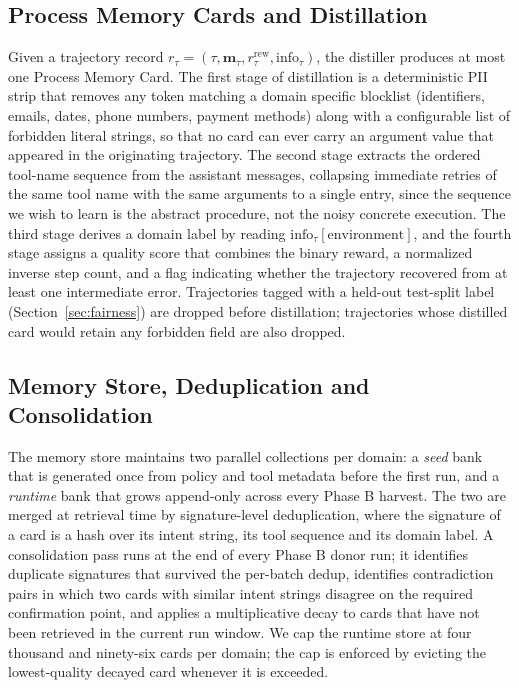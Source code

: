 \documentclass[conference]{IEEEtran}
\begin{document}
\subsection{Process Memory Cards and Distillation}

Given a trajectory record $r_\tau = (\tau, \mathbf{m}_\tau,
r_\tau^{\text{rew}}, \text{info}_\tau)$, the distiller produces at
most one Process Memory Card. The first stage of distillation is a
deterministic PII strip that removes any token matching a domain
specific blocklist (identifiers, emails, dates, phone numbers,
payment methods) along with a configurable list of forbidden
literal strings, so that no card can ever carry an argument value
that appeared in the originating trajectory. The second stage
extracts the ordered tool-name sequence from the assistant
messages, collapsing immediate retries of the same tool name with
the same arguments to a single entry, since the sequence we wish
to learn is the abstract procedure, not the noisy concrete
execution. The third stage derives a domain label by reading
$\text{info}_\tau[\text{environment}]$, and the fourth stage
assigns a quality score that combines the binary reward, a
normalized inverse step count, and a flag indicating whether the
trajectory recovered from at least one intermediate error.
Trajectories tagged with a held-out test-split label
(Section~\ref{sec:fairness}) are dropped before distillation;
trajectories whose distilled card would retain any forbidden field
are also dropped.

\subsection{Memory Store, Deduplication and Consolidation}

The memory store maintains two parallel collections per domain: a
\emph{seed} bank that is generated once from policy and tool
metadata before the first run, and a \emph{runtime} bank that
grows append-only across every Phase B harvest. The two are merged
at retrieval time by signature-level deduplication, where the
signature of a card is a hash over its intent string, its tool
sequence and its domain label. A consolidation pass runs at the
end of every Phase B donor run; it identifies duplicate signatures
that survived the per-batch dedup, identifies contradiction pairs
in which two cards with similar intent strings disagree on the
required confirmation point, and applies a multiplicative decay to
cards that have not been retrieved in the current run window. We
cap the runtime store at four thousand and ninety-six cards per
domain; the cap is enforced by evicting the lowest-quality decayed
card whenever it is exceeded.
\end{document}
